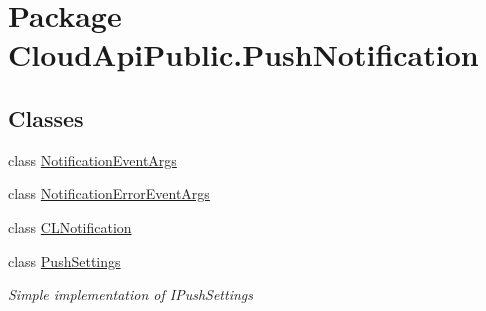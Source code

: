 \hypertarget{namespace_cloud_api_public_1_1_push_notification}{\section{Package Cloud\-Api\-Public.\-Push\-Notification}
\label{namespace_cloud_api_public_1_1_push_notification}
}
\subsection*{Classes}
\begin{DoxyCompactItemize}
\item 
class \hyperlink{class_cloud_api_public_1_1_push_notification_1_1_notification_event_args}{Notification\-Event\-Args}
\item 
class \hyperlink{class_cloud_api_public_1_1_push_notification_1_1_notification_error_event_args}{Notification\-Error\-Event\-Args}
\item 
class \hyperlink{class_cloud_api_public_1_1_push_notification_1_1_c_l_notification}{C\-L\-Notification}
\item 
class \hyperlink{class_cloud_api_public_1_1_push_notification_1_1_push_settings}{Push\-Settings}
\begin{DoxyCompactList}\small\item\em Simple implementation of I\-Push\-Settings \end{DoxyCompactList}\end{DoxyCompactItemize}

